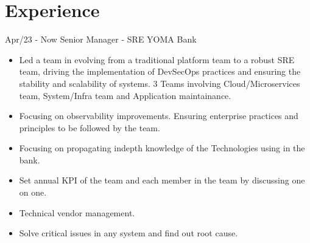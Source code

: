 \documentclass[]{friggeri-cv}
\begin{document}
\section{Experience}
\begin{entrylist}
  \entry
    {Apr/23 - Now}
    {Senior Manager - SRE}
    {YOMA Bank}
    { \begin{itemize}
      \item Led a team in evolving from a traditional platform team to a robust SRE team, driving the implementation of DevSecOps practices and ensuring the stability and scalability of systems. 3 Teams involving Cloud/Microservices team, System/Infra team and Application maintainance.
      \item Focusing on observability improvements. Ensuring enterprise practices and principles to be followed by the team.
      \item Focusing on propagating indepth knowledge of the Technologies using in the bank.
      \item Set annual KPI of the team and each member in the team by discussing one on one.
      \item Technical vendor management.
      \item Solve critical issues in any system and find out root cause.
      \end{itemize}
    }
  \end{entrylist}
\newpage
\end{document}
